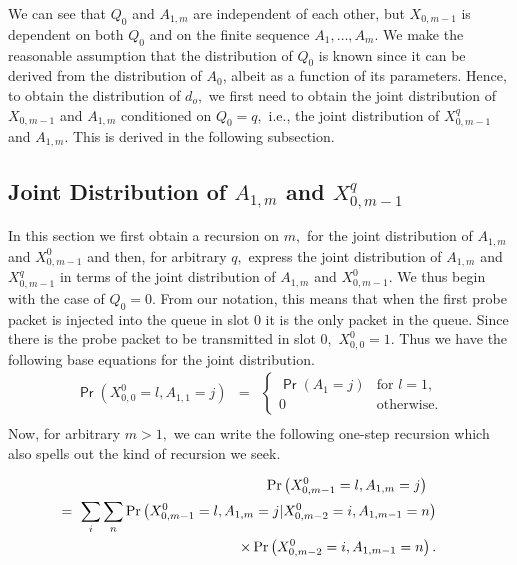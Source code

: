 \documentclass[11pt]{article}
\newcommand{\prob}[1]{\mathsf{\Pr}\left(#1\right)}
\begin{document}
We can see that $Q_0$ and $A_{1,m}$ are independent of each other, but
$X_{0,m-1}$ is dependent on both $Q_0$ and on the finite sequence
$A_1,\ldots, A_{m}.$ We make the reasonable assumption that the
distribution of $Q_0$ is known since it can be derived from the
distribution of $A_0$, albeit as a function of its parameters. Hence,
to obtain the distribution of $d_o,$ we first need to obtain the joint
distribution of $X_{0,m-1}$ and $A_{1,m}$ conditioned on $Q_0=q,$
i.e., the joint distribution of $X_{0,m-1}^q$ and $A_{1,m}.$ This is
derived in the following subsection.

\subsection{Joint Distribution of $A_{1,m}$ and $X_{0,m-1}^q$}
\label{sec:A_1,m-and-X_m-joint} 
In this section we first obtain a recursion on $m,$ for the joint
distribution of $A_{1,m}$ and $X^0_{0,m-1}$ and then, for arbitrary
$q,$ express the joint distribution of $A_{1,m}$ and $X^q_{0,m-1}$ in
terms of the joint distribution of $A_{1,m}$ and $X^0_{0,m-1}.$ We
thus begin with the case of $Q_0=0.$ From our notation, this means
that when the first probe packet is injected into the queue in slot
$0$ it is the only packet in the queue.  Since there is the probe
packet to be transmitted in slot $0,$ $X_{0,0}^0=1.$ Thus we have the
following base equations for the joint distribution.
\begin{eqnarray}
  \prob{X_{0,0}^0 = l, A_{1,1} = j} &=& 
  \begin{cases} 
    \prob{A_1 = j } & \mbox{for $l=1$},\\
    0 & \mbox{otherwise}.
  \end{cases} \nonumber \\
  \label{eq:base-equations}
\end{eqnarray}
Now, for arbitrary $m > 1,$ we can write the following one-step
recursion which also spells out the kind of recursion we seek. 


{\small
\begin{eqnarray}
  && \hspace{-0.35in} \prob{X_{0,m-1}^0=l , A_{1,m}=j } \  \ \nonumber \\ 
  && \hspace{-0.35in} = \ \sum_{i} \sum_{n} \prob{X_{0,m-1}^0=l,A_{1,m} =j |
    X^0_{0,m-2}=i, A_{1,m-1} = n} \nonumber \\  
  &&\hspace{0.4in} \times \, \prob{X_{0,m-2}^0=i, A_{1,m-1}=n}.
  \label{eq:basic-recursions}
\end{eqnarray}
}
\end{document}

